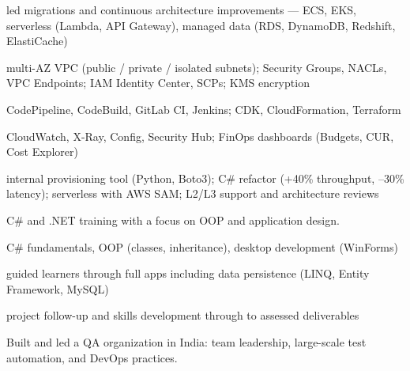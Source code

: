 \begin{cvitemize}
  \item {} led migrations and continuous architecture improvements --- ECS, EKS, serverless (Lambda, API Gateway), managed data (RDS, DynamoDB, Redshift, ElastiCache)
  \item {} multi-AZ VPC (public / private / isolated subnets); Security Groups, NACLs, VPC Endpoints; IAM Identity Center, SCPs; KMS encryption
  \item {} CodePipeline, CodeBuild, GitLab CI, Jenkins; CDK, CloudFormation, Terraform
  \item {} CloudWatch, X-Ray, Config, Security Hub; FinOps dashboards (Budgets, CUR, Cost Explorer)
  \item {} internal provisioning tool (Python, Boto3); C\# refactor (+40\% throughput, --30\% latency); serverless with AWS SAM; L2/L3 support and architecture reviews
\end{cvitemize}

\cvJobSeparator


C\# and .NET training with a focus on OOP and application design.

\begin{cvitemize}
  \item {} C\# fundamentals, OOP (classes, inheritance), desktop development (WinForms)
  \item {} guided learners through full apps including data persistence (LINQ, Entity Framework, MySQL)
  \item {} project follow-up and skills development through to assessed deliverables
\end{cvitemize}

\cvJobSeparator


Built and led a QA organization in India: team leadership, large-scale test automation, and DevOps practices.

